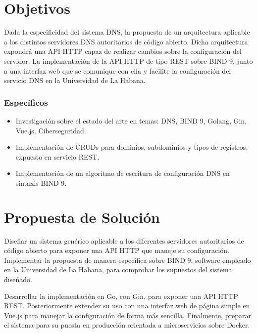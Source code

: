 
\section{Objetivos}


Dada la especificidad del sistema DNS, la propuesta de un arquitectura aplicable a los distintos servidores DNS autoritarios de código abierto. Dicha arquitectura expondrá una API HTTP capaz de realizar cambios sobre la configuración del servidor. La implementación de la API HTTP de tipo REST sobre BIND 9, junto a una interfaz web que se comunique con ella y facilite la configuración del servicio DNS en la Universidad de La Habana.

\subsubsection{Específicos}
\begin{itemize}
    \item Investigación sobre el estado del arte en temas: DNS, BIND 9, Golang, Gin, Vue.js, Ciberseguridad.
    \item Implementación de CRUDs para dominios, subdominios y tipos de registros, expuesto en servicio REST.
    \item Implementación de un algoritmo de escritura de configuración DNS en sintaxis BIND 9.
\end{itemize}

\section{Propuesta de Solución}

Diseñar un sistema genérico aplicable a los diferentes servidores autoritarios de código abierto para exponer una API HTTP que maneje su configuración. Implementar la propuesta de manera específica sobre BIND 9, software empleado en la Universidad de La Habana, para comprobar los supuestos del sistema diseñado.

Desarrollar la implementación en Go, con Gin, para exponer una API HTTP REST. Posteriormente extender su uso con una interfaz web de página simple en Vue.js para manejar la configuración de forma más sencilla. Finalmente, preparar el sistema para su puesta en producción orientada a microservicios sobre Docker. 

